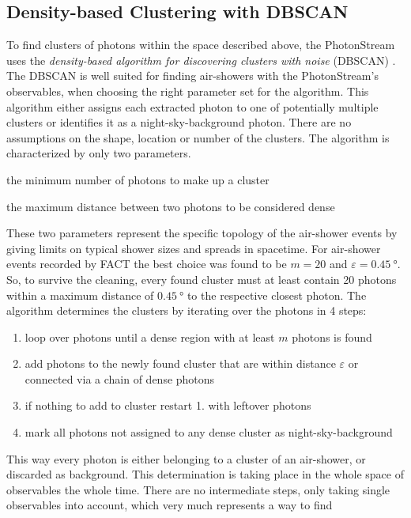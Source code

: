 \subsection{Density-based Clustering with DBSCAN}
%
To find clusters of photons within the space described above, the PhotonStream
uses the \textit{density-based algorithm for discovering clusters with noise}
(DBSCAN) \cite{DBSCAN}. The DBSCAN is well suited for finding air-showers with the
PhotonStream's observables, when choosing the right parameter set for the algorithm. This
algorithm either assigns each extracted photon to one of potentially multiple
clusters or identifies it as a night-sky-background photon. There are no
assumptions on the shape, location or number of the clusters. The algorithm is
characterized by only two parameters.
%
\begin{description}[align=right]
  \item[m] the minimum number of photons to make up a cluster
  \item[$\symbf{\varepsilon}$] the maximum distance between two photons to be considered dense
\end{description}
%
These two parameters represent the specific topology of the air-shower events
by giving limits on typical shower sizes and spreads in spacetime. For
air-shower events recorded by FACT the best choice was found to be $m = 20$ and
$\varepsilon = \SI{0.45}{\degree}$. So, to survive the cleaning, every found
cluster must at least contain 20 photons within a maximum distance of
$\SI{0.45}{\degree}$ to the respective closest photon. The algorithm determines
the clusters by iterating over the photons in 4 steps:
%
\begin{enumerate}
  \item loop over photons until a dense region with at least $m$ photons is found
  \item add photons to the newly found cluster that are within distance $\varepsilon$ or connected via a chain of dense photons
  \item if nothing to add to cluster restart 1. with leftover photons
  \item mark all photons not assigned to any dense cluster as night-sky-background
\end{enumerate}
%
This way every photon is either belonging to a cluster of an air-shower, or
discarded as background. This determination is taking place in the whole space
of observables the whole time. There are no intermediate steps, only taking
single observables into account, which very much represents a way to find
